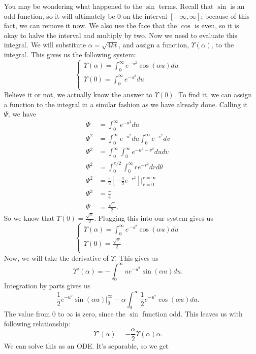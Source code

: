 \documentclass{article}
\begin{document}
You may be wondering what happened to the $\sin$ terms. Recall that $\sin$ is an odd function, so it will ultimately be $0$ on the interval $[-\infty,\infty]$; because of this fact, we can remove it now. We also use the face that the $\cos$ is even, so it is okay to halve the interval and multiply by two. Now we need to evaluate this integral. We will substitute $\alpha = \sqrt{4kt}$, and assign a function, $\Upsilon(\alpha)$, to the integral. This gives us the following system:
\[
\begin{cases}
\Upsilon(\alpha) = \int_{0}^{\infty}e^{-u^{2}}\cos{(\alpha u)}du\\
\Upsilon(0) = \int_{0}^{\infty}e^{-u^{2}}du\\
\end{cases}
\]
Believe it or not, we actually know the answer to $\Upsilon(0)$. To find it, we can assign a function to the integral in a similar fashion as we have already done. Calling it $\Psi$, we have
\begin{align*}
\Psi &= \int_{0}^{\infty}e^{-u^{2}}du\\
\Psi^{2} &= \int_{0}^{\infty}e^{-u^{2}}du \int_{0}^{\infty}e^{-v^{2}}dv\\
\Psi^{2} &= \int_{0}^{\infty}\int_{0}^{\infty}e^{-u^{2}-v^{2}}dudv\\
\Psi^{2} &= \int_{0}^{\pi/2}\int_{0}^{\infty}re^{-r^{2}}drd\theta\\
\Psi^{2} &= \frac{\pi}{2}\left[-\frac{1}{2}e^{-r^{2}}\right]\Bigg |_{r=0}^{r=\infty}\\
\Psi^{2} &= \frac{\pi}{4}\\
\Psi &= \frac{\sqrt{\pi}}{2}.
\end{align*}
So we know that $\Upsilon(0) = \frac{\sqrt{\pi}}{2}$. Plugging this into our system gives us
\[
\begin{cases}
\Upsilon(\alpha) = \int_{0}^{\infty}e^{-u^{2}}\cos{(\alpha u)}du\\
\Upsilon(0) = \frac{\sqrt{\pi}}{2}\\
\end{cases}
\]
Now, we will take the derivative of $\Upsilon$. This gives us
\[
\Upsilon'(\alpha) = -\int_{0}^{\infty}ue^{-u^{2}}\sin{(\alpha u)}du.
\]
Integration by parts gives us
\[
\frac{1}{2}e^{-u^{2}}\sin{(\alpha u)}\Big |_{0}^{\infty} - \alpha\int_{0}^{\infty}\frac{1}{2}e^{-u^{2}}\cos{(\alpha u)}du.
\]
The value from $0$ to $\infty$ is zero, since the $\sin$ function odd. This leaves us with following relationship:
\[
\Upsilon'(\alpha) = -\frac{\alpha}{2}\Upsilon(\alpha) \alpha.
\]
We can solve this as an ODE. It's separable, so we get
\end{document}
